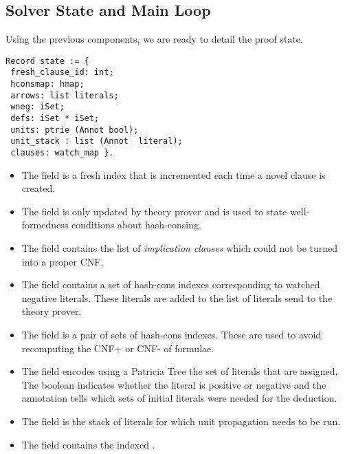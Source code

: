 \documentclass[a4paper,UKenglish,cleveref, autoref, thm-restate]{lipics-v2019}
\begin{document}
\subsection{Solver State and Main Loop}
Using the previous components, we are ready to detail the proof state. %
\begin{verbatim}
Record state := {
 fresh_clause_id: int;
 hconsmap: hmap;
 arrows: list literals;
 wneg: iSet;
 defs: iSet * iSet;
 units: ptrie (Annot bool);
 unit_stack : list (Annot  literal);
 clauses: watch_map }.
\end{verbatim}
\begin{itemize}
\item The field  is a fresh index that is incremented
  each time a novel clause is created.
\item The field  is only
updated by theory prover and is used to state well-formedness
conditions about hash-consing.
\item The field  contains the
list of \emph{implication clauses} which could not be turned into a proper CNF.
%
\item The field  contains a set of hash-cons indexes
corresponding to watched negative literals. These literals are added
to the list of literals send to the theory prover.
\item The field  is a pair of sets of hash-cons indexes.
These are used to avoid recomputing the CNF+ or CNF- of formulae.
\item The field  encodes using a Patricia Tree the set of
literals that are assigned.  The boolean indicates whether the literal
is positive or negative and the annotation tells which sets of initial
literals were needed for the deduction.
\item The field  is the stack of literals for which
  unit propagation needs to be run.
\item The field  contains the indexed .
\end{itemize}
\end{document}
